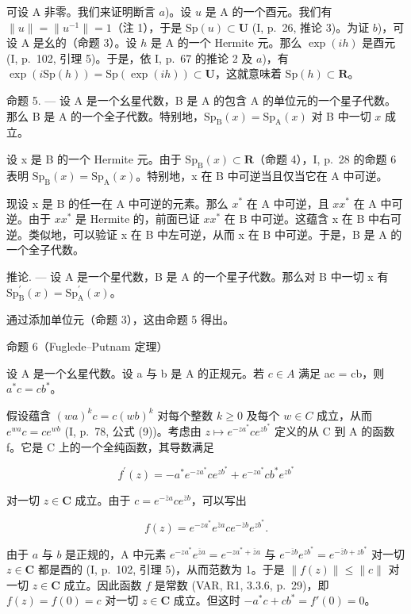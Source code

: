 可设 A 非零。我们来证明断言 \(a\))。设 \(u\) 是 A 的一个酉元。我们有 \(\|u\|=\|u^{-1}\|=1\)（注 1），于是 \(\mathrm{Sp}(u)\subset\mathbf{U}\) (I, p.~26, 推论 3)。为证 \(b\))，可设 A 是幺的（命题 3）。设 \(h\) 是 A 的一个 Hermite 元。那么 \(\exp(ih)\) 是酉元 (I, p.~102, 引理 5)。于是，依 I, p.~67 的推论 2 及 \(a\))，有 \(\exp(i\mathrm{Sp}(h))=\mathrm{Sp}(\exp(ih))\subset\mathbf{U}\)，这就意味着 \(\mathrm{Sp}(h)\subset\mathbf{R}\)。

命题 5. — 设 A 是一个幺星代数，B 是 A 的包含 A 的单位元的一个星子代数。那么 B 是 A 的一个全子代数。特别地，\(\mathrm{Sp}_{\mathrm{B}}(x) = \mathrm{Sp}_{\mathrm{A}}(x)\) 对 B 中一切 \(x\) 成立。

设 x 是 B 的一个 Hermite 元。由于 \(\mathrm{Sp}_{\mathrm{B}}(x) \subset \mathbf{R}\)（命题 4），I, p.~28 的命题 6 表明 \(\mathrm{Sp}_{\mathrm{B}}(x) = \mathrm{Sp}_{\mathrm{A}}(x)\)。特别地，x 在 B 中可逆当且仅当它在 A 中可逆。

现设 x 是 B 的任一在 A 中可逆的元素。那么 \(x^{*}\) 在 A 中可逆，且 \(xx^{*}\) 在 A 中可逆。由于 \(xx^{*}\) 是 Hermite 的，前面已证 \(xx^{*}\) 在 B 中可逆。这蕴含 x 在 B 中右可逆。类似地，可以验证 x 在 B 中左可逆，从而 x 在 B 中可逆。于是，B 是 A 的一个全子代数。

推论. --- 设 A 是一个星代数，B 是 A 的一个星子代数。那么对 B 中一切 x 有 \(\mathrm{Sp}_{\mathrm{B}}^{\prime}(x)=\mathrm{Sp}_{\mathrm{A}}^{\prime}(x)\)。

通过添加单位元（命题 3），这由命题 5 得出。

命题 6（Fuglede–Putnam 定理）

设 A 是一个幺星代数。设 a 与 b 是 A 的正规元。若 \(c \in A\) 满足 ac = cb，则 \(a^{*}c = cb^{*}\)。

假设蕴含 \((wa)^{k}c = c(wb)^{k}\) 对每个整数 \(k \geqslant 0\) 及每个 \(w \in C\) 成立，从而 \(e^{wa}c = ce^{wb}\) (I, p.~78, 公式 (9))。考虑由 \(z \mapsto e^{-za^{*}}ce^{zb^{*}}\) 定义的从 C 到 A 的函数 f。它是 C 上的一个全纯函数，其导数满足

\[
f ^ {\prime} (z) = - a ^ {*} e ^ {- z a ^ {*}} c e ^ {z b ^ {*}} + e ^ {- z a ^ {*}} c b ^ {*} e ^ {z b ^ {*}}
\]

对一切 \(z \in \mathbf{C}\) 成立。由于 \(c = e^{-\overline{z}a} ce^{\overline{z}b}\)，可以写出

\[
f (z) = e ^ {- z a ^ {*}} e ^ {\overline {{z}} a} c e ^ {- \overline {{z}} b} e ^ {z b ^ {*}}.
\]

由于 \(a\) 与 \(b\) 是正规的，A 中元素 \(e^{-za^*}e^{\overline{z} a} = e^{-za^* + \overline{z} a}\) 与 \(e^{-\overline{z} b}e^{zb^*} = e^{-\overline{z} b + zb^*}\) 对一切 \(z\in \mathbf{C}\) 都是酉的 (I, p.~102, 引理 5)，从而范数为 1。于是 \(\| f(z)\| \leqslant \| c\|\) 对一切 \(z\in \mathbf{C}\) 成立。因此函数 \(f\) 是常数 (VAR, R1, 3.3.6, p.~29)，即 \(f(z) = f(0) = c\) 对一切 \(z\in \mathbf{C}\) 成立。但这时 \(-a^{*}c + cb^{*} = f'(0) = 0\)。

